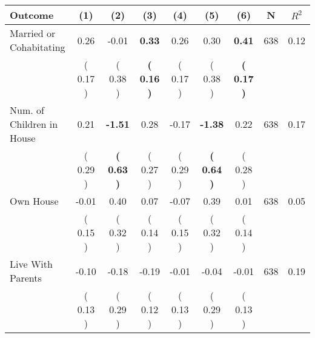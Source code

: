 \begin{tabular}{lcccccccc}
\toprule
 \textbf{Outcome} & \textbf{(1)} & \textbf{(2)} & \textbf{(3)} & \textbf{(4)} & \textbf{(5)} & \textbf{(6)} & \textbf{N} & \textbf{$ R^2$} \\
\midrule
Married or Cohabitating &      0.26 &     -0.01 & \textbf{     0.33} &      0.26 &      0.30 & \textbf{     0.41} & 638 &       0.12 \\ 
 & (     0.17 ) & (     0.38 ) & \textbf{(     0.16 )} & (     0.17 ) & (     0.38 ) & \textbf{(     0.17 )} & \\
Num. of Children in House &      0.21 & \textbf{    -1.51} &      0.28 &     -0.17 & \textbf{    -1.38} &      0.22 & 638 &       0.17 \\ 
 & (     0.29 ) & \textbf{(     0.63 )} & (     0.27 ) & (     0.29 ) & \textbf{(     0.64 )} & (     0.28 ) & \\
Own House &     -0.01 &      0.40 &      0.07 &     -0.07 &      0.39 &      0.01 & 638 &       0.05 \\ 
 & (     0.15 ) & (     0.32 ) & (     0.14 ) & (     0.15 ) & (     0.32 ) & (     0.14 ) & \\
Live With Parents &     -0.10 &     -0.18 &     -0.19 &     -0.01 &     -0.04 &     -0.01 & 638 &       0.19 \\ 
 & (     0.13 ) & (     0.29 ) & (     0.12 ) & (     0.13 ) & (     0.29 ) & (     0.13 ) & \\
\bottomrule
\end{tabular}
